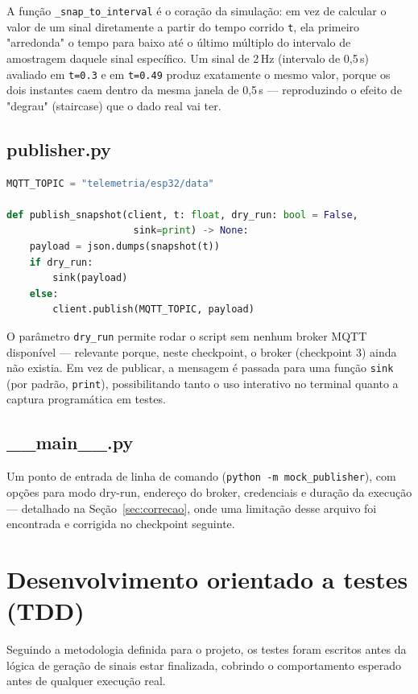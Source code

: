\documentclass[11pt,a4paper]{article}
\begin{document}
A função \texttt{\_snap\_to\_interval} é o coração da simulação: em vez de calcular o valor de um sinal diretamente a partir do tempo corrido \texttt{t}, ela primeiro "arredonda" o tempo para baixo até o último múltiplo do intervalo de amostragem daquele sinal específico. Um sinal de 2\,Hz (intervalo de 0,5\,s) avaliado em \texttt{t=0.3} e em \texttt{t=0.49} produz exatamente o mesmo valor, porque os dois instantes caem dentro da mesma janela de 0,5\,s --- reproduzindo o efeito de "degrau" (staircase) que o dado real vai ter.

\subsection{publisher.py}

\begin{lstlisting}[language=Python,caption={mock\_publisher/publisher.py}]
MQTT_TOPIC = "telemetria/esp32/data"

def publish_snapshot(client, t: float, dry_run: bool = False,
                      sink=print) -> None:
    payload = json.dumps(snapshot(t))
    if dry_run:
        sink(payload)
    else:
        client.publish(MQTT_TOPIC, payload)
\end{lstlisting}

O parâmetro \texttt{dry\_run} permite rodar o script sem nenhum broker MQTT disponível --- relevante porque, neste checkpoint, o broker (checkpoint 3) ainda não existia. Em vez de publicar, a mensagem é passada para uma função \texttt{sink} (por padrão, \texttt{print}), possibilitando tanto o uso interativo no terminal quanto a captura programática em testes.

\subsection{\_\_main\_\_.py}

Um ponto de entrada de linha de comando (\texttt{python -m mock\_publisher}), com opções para modo dry-run, endereço do broker, credenciais e duração da execução --- detalhado na Seção~\ref{sec:correcao}, onde uma limitação desse arquivo foi encontrada e corrigida no checkpoint seguinte.

\section{Desenvolvimento orientado a testes (TDD)}

Seguindo a metodologia definida para o projeto, os testes foram escritos antes da lógica de geração de sinais estar finalizada, cobrindo o comportamento esperado antes de qualquer execução real.
\end{document}
